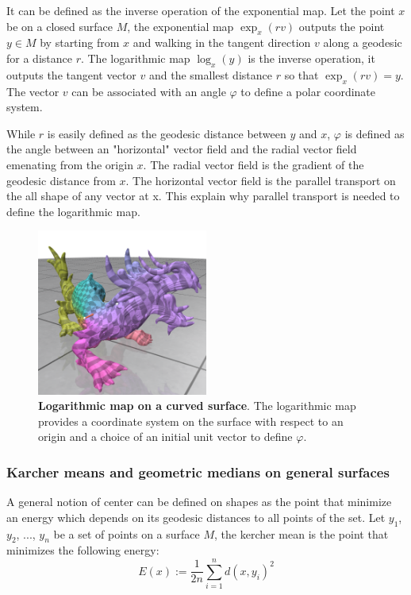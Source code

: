 \documentclass[sigconf, nonacm]{acmart}
\begin{document}
It can be defined as the inverse operation of the exponential map. Let the point $x$ be on a closed surface $M$, the exponential map $\exp_x (rv)$ outputs the point $y\in M$ by starting from $x$ and walking in the tangent direction $v$ along a geodesic for a distance $r$. The logarithmic map $\log_x(y)$ is the inverse operation, it outputs the tangent vector $v$ and the smallest distance $r$ so that $\exp_x (rv)=y$. The vector $v$ can be associated with an angle $\varphi$ to define a polar coordinate system.

While $r$ is easily defined as the geodesic distance between $y$ and $x$, $\varphi$ is defined as the angle between an "horizontal" vector field and the radial vector field emenating from the origin $x$. The radial vector field is the gradient of the geodesic distance from $x$. The horizontal vector field is the parallel transport on the all shape of any vector at x. This explain why parallel transport is needed to define the logarithmic map. 

\begin{figure}[h]
  \centering
  \includegraphics[width=0.5\textwidth]{dragon_log_map.png}
  \caption{\textbf{Logarithmic map on a curved surface}. \textmd{The logarithmic map provides a coordinate system on the surface with respect to an origin and a choice of an initial unit vector to define $\varphi$.}}
  \label{fig:logarithmic_map}
\end{figure}


\subsubsection{Karcher means and geometric medians on general surfaces }
A general notion of center can be defined on shapes as the point that minimize an energy which depends on its geodesic distances to all points of the set. 
Let $y_1$, $y_2$, ..., $y_n$ be a set of points on a surface $M$, the kercher mean is the point that minimizes the following energy:
$$E(x):=\frac{1}{2n}\sum_{i=1}^{n}d(x,y_i)^2$$
\end{document}
